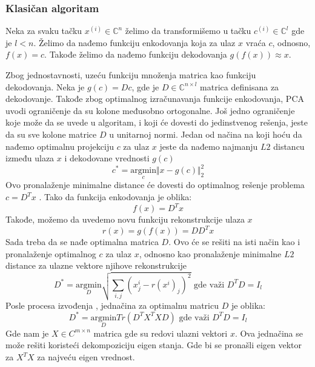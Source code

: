 \documentclass[12pt, letterpaper, oneside]{article}
\begin{document}
\subsubsection{Klasičan algoritam}
Neka za svaku tačku $x^{(i)} \in \mathbb{C}^n$ želimo da transformišemo u tačku $c^{(i)} \in \mathbb{C}^l$ gde je $l < n$.
Želimo da nađemo funkciju enkodovanja koja za ulaz $x$ vraća $c$, odnosno, $f(x)=c$. Takođe želimo da nađemo funkciju dekodovanja $g(f(x)) \approx x$.

Zbog jednostavnosti, uzeću funkciju množenja matrica kao funkciju\\
dekodovanja. Neka je $g(c)=Dc$, gde je
$D \in \mathbb{C}^{n \times l}$ matrica definisana za dekodovanje. Takođe zbog optimalnog izračunavanja funkcije enkodovanja, 
PCA uvodi ograničenje da su kolone međusobno ortogonalne. Još jedno ograničenje koje može da se uvede u algoritam,
i koji će dovesti do jedinstvenog rešenja, jeste da su sve kolone matrice $D$ u unitarnoj normi.
Jedan od načina na koji hoću da nađemo optimalnu projekciju $c$ za ulaz $x$ jeste da nađemo najmanju $L2$ distancu između ulaza $x$ i dekodovane vrednosti $g(c)$
\[
  c^{*} = \underset{c}{\mathrm{argmin}} \Vert x-g(c) \Vert_2^2
\]
Ovo pronalaženje minimalne distance će dovesti do optimalnog rešenje problema $c=D^{T}x$ \cite{goodfellow2016deep}. Tako da funkcija enkodovanja je oblika:
\[
f(x) = D^T x
\]
Takođe, možemo da uvedemo novu funkciju rekonstrukcije ulaza $x$
\[
  r(x) = g(f(x)) = DD^T x
\]
Sada treba da se nađe optimalna matrica $D$. Ovo će se rešiti na isti način kao i pronalaženje optimalnog $c$ za ulaz $x$, odnosno kao pronalaženje minimalne $L2$ distance za ulazne vektore
njihove rekonstrukcije
\[
    D^{*} =\underset{D}{\mathrm{argmin}} \sqrt{\sum_{i,j}(x^i_j - r(x^i)_j)^2} \text{ gde važi } D^TD = I_l
\]
Posle procesa izvođenja \cite{goodfellow2016deep}, jednačina za optimalnu matricu $D$ je oblika:
\[
    D^{*} =\underset{D}{\mathrm{argmin}}  Tr(D^TX^TXD) \text{ gde važi } D^TD = I_l
\] 
Gde nam je $X \in C^{m \times n}$ matrica gde su redovi ulazni vektori $x$. Ova jednačina se može rešiti koristeći dekompoziciju eigen stanja.
Gde bi se pronašli eigen vektor za $X^TX$ za najveću eigen vrednost. 
\end{document}
